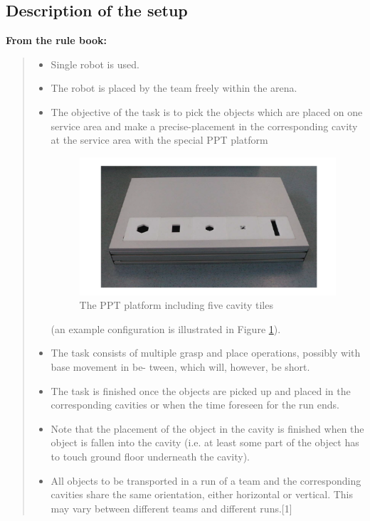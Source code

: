 \documentclass{article}
\begin{document}
\subsection{Description of the setup}
\textbf{From the rule book:}
\begin{quote}
\begin{itemize}
\item Single robot is used. 
\item The robot is placed by the team freely within the arena. 
\item The objective of the task is to pick the objects which are placed on one service area and make a
precise-placement in the corresponding cavity at the service area with the special PPT platform
\begin{figure}[h!]
\centering
\includegraphics[scale=0.5]{images/PPT_Platform.png}
\caption{The PPT platform including five cavity tiles}
\label{fig:PPT}
\end{figure}
(an example configuration is illustrated in Figure
\ref{fig:PPT}).
\item The task consists of multiple grasp and place operations, possibly with base movement in be-
tween, which will, however, be short. 
\item The task is finished once the objects are picked up and
placed in the corresponding cavities or when the time foreseen for the run ends.
\item  Note that the
placement of the object in the cavity is finished when the object is fallen into the cavity (i.e.  at
least some part of the object has to touch ground floor underneath the cavity).
\item
All objects to be transported in a run of a team and the corresponding cavities share the same
orientation, either horizontal or vertical.  This may vary between different teams and different
runs.[1]\\
\end{itemize}

\end{quote}
\end{document}
